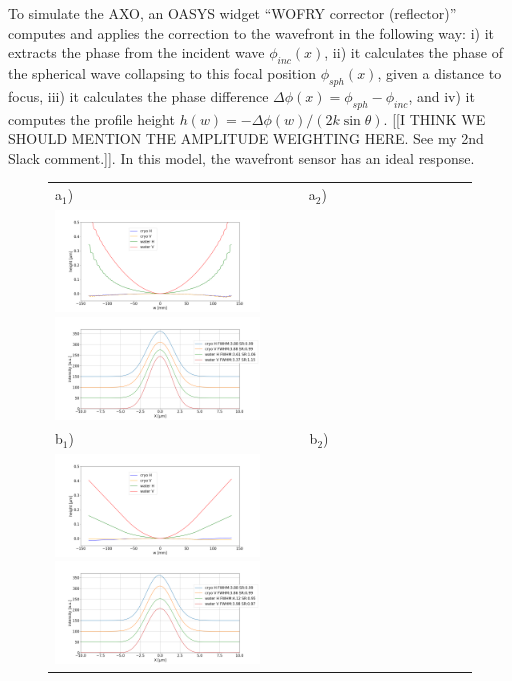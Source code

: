 \documentclass[preprint]{iucr}
\begin{document}
To simulate the AXO, an OASYS widget ``WOFRY corrector (reflector)'' computes and applies the correction to the wavefront in the following way: i) it extracts the phase from the incident wave $\phi_{inc}(x)$, ii)  it calculates the phase of the spherical wave collapsing to this focal position $\phi_{sph}(x)$, given a distance to focus, %
iii) it calculates the phase difference $\Delta \phi(x) = \phi_{sph} - \phi_{inc}$, and iv) it computes the profile height $h(w) = -\Delta \phi(w) / (2 k \sin \theta)$. [[I THINK WE SHOULD MENTION THE AMPLITUDE WEIGHTING HERE. See my 2nd Slack comment.]]. In this model, the wavefront sensor has an ideal response.

   \begin{figure}
   \label{fig:intensitycorrected} 
   \begin{center}
   \begin{tabular}{l} 
  a$_1$)~~~~~~~~~~~~~~~~~~~~~~~~~~~~~~~~~
  a$_2$)\\
    \includegraphics[width=0.5\textwidth]{figures/correctionprofiles.png}
    \includegraphics[width=0.5\textwidth]{figures/intensitycorrected.png} \\ 
  b$_1$)~~~~~~~~~~~~~~~~~~~~~~~~~~~~~~~~~
  b$_2$)\\
   \includegraphics[width=0.5\textwidth]{figures/correctionprofilesextrapolated.png}
   \includegraphics[width=0.5\textwidth]{figures/intensitycorrectedextrapolated.png} \\   

\end{tabular}
\end{center}
\end{figure}
\end{document}
